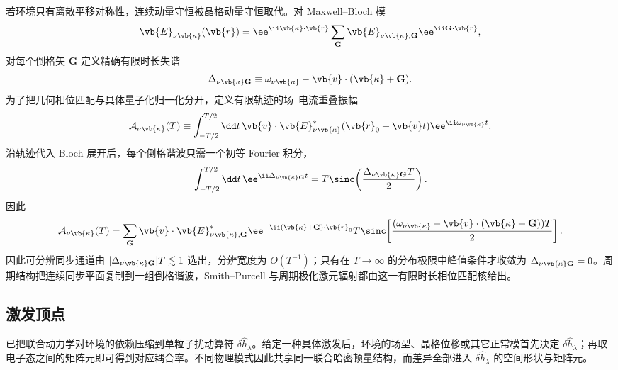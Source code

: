 若环境只有离散平移对称性，连续动量守恒被晶格动量守恒取代。对 Maxwell--Bloch 模
\begin{equation}
{
\vb{E}_{\nu\vb{\kappa}}(\vb{r})
=\ee^{\ii\vb{\kappa}\cdot\vb{r}}
\sum_{\mathbf G}\vb{E}_{\nu\vb{\kappa},\mathbf G}
\ee^{\ii\mathbf G\cdot\vb{r}},}
\label{eq:maxwell_bloch_mode_expansion}
\end{equation}
对每个倒格矢 $\mathbf G$ 定义精确有限时长失谐
\begin{equation*}
 \Delta_{\nu\vb{\kappa}\mathbf G}
 \equiv\omega_{\nu\vb{\kappa}}-\vb{v}\cdot(\vb{\kappa}+\mathbf G).
\end{equation*}
为了把几何相位匹配与具体量子化归一化分开，定义有限轨迹的场--电流重叠振幅
\begin{equation*}
\mathcal A_{\nu\vb{\kappa}}(T)
\equiv
\int_{-T/2}^{T/2}\dd t\,
\vb{v}\cdot\vb{E}_{\nu\vb{\kappa}}^*(\vb{r}_0+\vb{v}t)
\ee^{\ii\omega_{\nu\vb{\kappa}}t}.
\end{equation*}
沿轨迹代入 Bloch 展开后，每个倒格谐波只需一个初等 Fourier 积分，
\begin{equation*}
\int_{-T/2}^{T/2}\dd t\,
\ee^{\ii\Delta_{\nu\vb{\kappa}\mathbf G}t}
=T\sinc\!\left(\frac{\Delta_{\nu\vb{\kappa}\mathbf G}T}{2}\right).
\end{equation*}
因此
\begin{equation}
{
\mathcal A_{\nu\vb{\kappa}}(T)=
\sum_{\mathbf G}
\vb{v}\cdot\vb{E}_{\nu\vb{\kappa},\mathbf G}^*
\ee^{-\ii(\vb{\kappa}+\mathbf G)\cdot\vb{r}_0}
T\sinc\!\left[
\frac{(\omega_{\nu\vb{\kappa}}-\vb{v}\cdot(\vb{\kappa}+\mathbf G))T}{2}
\right].}
\label{eq:periodic_finite_time_sync_amplitude}
\end{equation}
因此可分辨同步通道由 $|\Delta_{\nu\vb{\kappa}\mathbf G}|T\lesssim1$ 选出，分辨宽度为 $O(T^{-1})$；只有在 $T\to\infty$ 的分布极限中峰值条件才收敛为 $\Delta_{\nu\vb{\kappa}\mathbf G}=0$。周期结构把连续同步平面复制到一组倒格谐波，Smith--Purcell 与周期极化激元辐射都由这一有限时长相位匹配核给出。

\subsection{激发顶点}

 已把联合动力学对环境的依赖压缩到单粒子扰动算符 $\delta\hat h_\lambda$。给定一种具体激发后，环境的场型、晶格位移或其它正常模首先决定 $\delta\hat h_\lambda$；再取电子态之间的矩阵元即可得到对应耦合率。不同物理模式因此共享同一联合哈密顿量结构，而差异全部进入 $\delta\hat h_\lambda$ 的空间形状与矩阵元。

